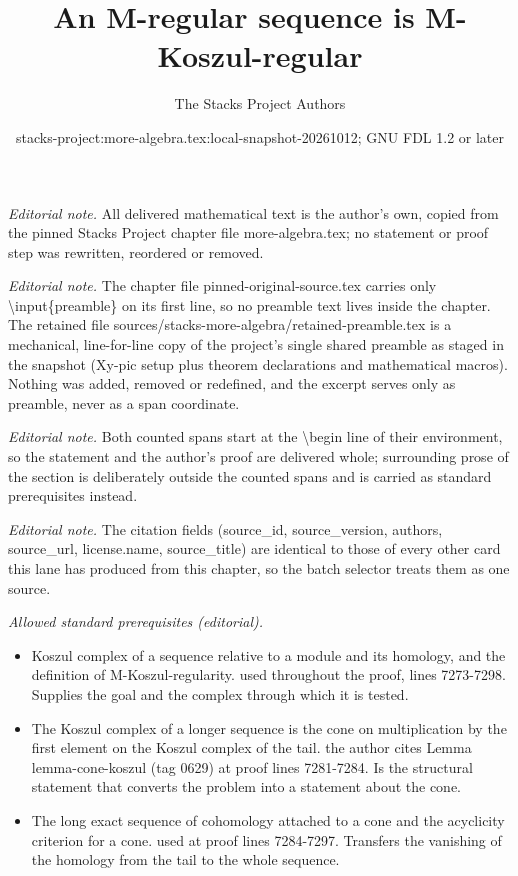 \documentclass[10pt,a4paper]{amsart}
\title{An M-regular sequence is M-Koszul-regular}
\author{The Stacks Project Authors}
\date{stacks-project:more-algebra.tex:local-snapshot-20261012; GNU FDL 1.2 or later}
\theoremstyle{plain}
\theoremstyle{definition}
\theoremstyle{remark}
\numberwithin{equation}{subsection}
\begin{document}
\maketitle
\setcounter{subsection}{1}
\noindent\textit{Editorial note.} All delivered mathematical text is the author's own, copied from the pinned Stacks Project chapter file more-algebra.tex; no statement or proof step was rewritten, reordered or removed.\par\medskip
\noindent\textit{Editorial note.} The chapter file pinned-original-source.tex carries only \textbackslash{}input\{preamble\} on its first line, so no preamble text lives inside the chapter. The retained file sources/stacks-more-algebra/retained-preamble.tex is a mechanical, line-for-line copy of the project's single shared preamble as staged in the snapshot (Xy-pic setup plus theorem declarations and mathematical macros). Nothing was added, removed or redefined, and the excerpt serves only as preamble, never as a span coordinate.\par\medskip
\noindent\textit{Editorial note.} Both counted spans start at the \textbackslash{}begin line of their environment, so the statement and the author's proof are delivered whole; surrounding prose of the section is deliberately outside the counted spans and is carried as standard prerequisites instead.\par\medskip
\noindent\textit{Editorial note.} The citation fields (source\_id, source\_version, authors, source\_url, license.name, source\_title) are identical to those of every other card this lane has produced from this chapter, so the batch selector treats them as one source.\par\medskip
\noindent\textit{Allowed standard prerequisites (editorial).}\begin{itemize}
\item Koszul complex of a sequence relative to a module and its homology, and the definition of M-Koszul-regularity. used throughout the proof, lines 7273-7298. Supplies the goal and the complex through which it is tested.
\item The Koszul complex of a longer sequence is the cone on multiplication by the first element on the Koszul complex of the tail. the author cites Lemma lemma-cone-koszul (tag 0629) at proof lines 7281-7284. Is the structural statement that converts the problem into a statement about the cone.
\item The long exact sequence of cohomology attached to a cone and the acyclicity criterion for a cone. used at proof lines 7284-7297. Transfers the vanishing of the homology from the tail to the whole sequence.
\end{itemize}\medskip
\end{document}
